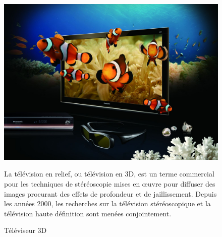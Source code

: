 \begin{figure}[htbp]
\begin{minipage}[c]{.40\linewidth}
\begin{center}
\includegraphics[width=\linewidth]{img/tele.jpg}
\caption{Téléviseur 3D}
\label{fig:image5}
\end{center}
\end{minipage}
\hfill
\begin{minipage}[c]{.55\linewidth}
La télévision en relief, ou télévision en 3D, est un terme commercial pour les techniques de stéréoscopie mises en \oe uvre pour diffuser des images procurant des effets de profondeur et de jaillissement. Depuis les années 2000, les recherches sur la télévision stéréoscopique et la télévision haute définition sont menées conjointement.
\end{minipage}
\end{figure}

